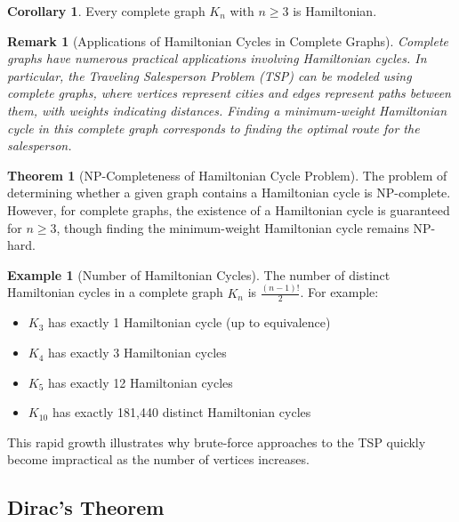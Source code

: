 \documentclass{article}
\newtheorem{remark}{Remark}
\theoremstyle{definition}
\newtheorem{example}{Example}
\newtheorem{theorem}{Theorem}
\newtheorem{corollary}{Corollary}
\begin{document}
\begin{corollary}
Every complete graph $K_n$ with $n \geq 3$ is Hamiltonian.
\end{corollary}
\begin{remark}[Applications of Hamiltonian Cycles in Complete Graphs]
Complete graphs have numerous practical applications involving Hamiltonian cycles. In particular, the Traveling Salesperson Problem (TSP) can be modeled using complete graphs, where vertices represent cities and edges represent paths between them, with weights indicating distances. Finding a minimum-weight Hamiltonian cycle in this complete graph corresponds to finding the optimal route for the salesperson.
\end{remark}


\begin{theorem}[NP-Completeness of Hamiltonian Cycle Problem]
The problem of determining whether a given graph contains a Hamiltonian cycle is NP-complete. However, for complete graphs, the existence of a Hamiltonian cycle is guaranteed for $n \geq 3$, though finding the minimum-weight Hamiltonian cycle remains NP-hard.
\end{theorem}

\begin{example}[Number of Hamiltonian Cycles]
The number of distinct Hamiltonian cycles in a complete graph $K_n$ is $\frac{(n-1)!}{2}$. For example:
\begin{itemize}
    \item $K_3$ has exactly 1 Hamiltonian cycle (up to equivalence)
    \item $K_4$ has exactly 3 Hamiltonian cycles
    \item $K_5$ has exactly 12 Hamiltonian cycles
    \item $K_{10}$ has exactly 181,440 distinct Hamiltonian cycles
\end{itemize}
This rapid growth illustrates why brute-force approaches to the TSP quickly become impractical as the number of vertices increases.
\end{example}
\subsection{Dirac's Theorem}
\end{document}
